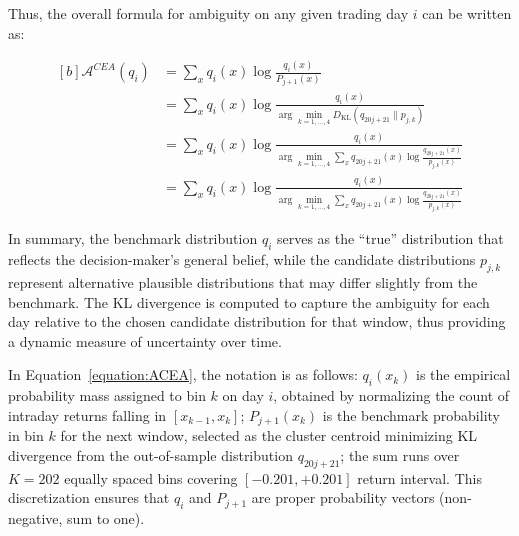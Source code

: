\documentclass[preprint,12pt,authoryear]{elsarticle}
\renewcommand{\textcolor}[2]{\begingroup\color{#1}#2\endgroup}
\begin{document}
Thus, the overall formula for ambiguity on any given trading day \(i\) can be written as:

\begin{equation}
\label{equation:ACEA}
\begin{aligned}[b]
\mathcal{A}^{CEA}(q_i) &= \sum_{x} q_i(x) \log \frac{q_i(x)}{P_{j+1}(x)} \\
&= \sum_{x} q_i(x) \log \frac{q_i(x)}{\arg\min_{k=1,\dots,4} D_{\mathrm{KL}}(q_{20j+21} \parallel p_{j,k})} \\
&= \sum_{x} q_i(x) \log \frac{q_i(x)}{\arg\min_{k=1,\dots,4} \sum_{x} q_{20j+21}(x) \log \frac{q_{20j+21}(x)}{p_{j,k}(x)}} \\
&= \sum_{x} q_i(x) \log \frac{q_i(x)}{\arg\min_{k=1,\dots,4} \sum_{x} q_{20j+21}(x) \log \frac{q_{20j+21}(x)}{p_{j,k}(x)}}
\end{aligned}
\end{equation}

In summary, the benchmark distribution \(q_i\) serves as the ``true'' distribution that reflects the decision-maker's general belief, while the candidate distributions \(p_{j,k}\) represent alternative plausible distributions that may differ slightly from the benchmark. The KL divergence is computed to capture the ambiguity for each day relative to the chosen candidate distribution for that window, thus providing a dynamic measure of uncertainty over time.

\textcolor{red}{In Equation~\ref{equation:ACEA}, the notation is as follows: $q_i(x_k)$ is the empirical probability mass assigned to bin $k$ on day $i$, obtained by normalizing the count of intraday returns falling in $[x_{k-1}, x_k]$; $P_{j+1}(x_k)$ is the benchmark probability in bin $k$ for the next window, selected as the cluster centroid minimizing KL divergence from the out-of-sample distribution $q_{20j+21}$; the sum runs over $K=202$ equally spaced bins covering $[-0.201, +0.201]$ return interval. This discretization ensures that $q_i$ and $P_{j+1}$ are proper probability vectors (non-negative, sum to one).}
\end{document}

